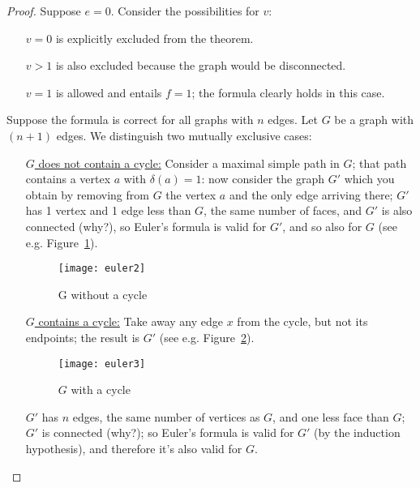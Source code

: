 \begin{proof}

{
Suppose
$e=0$. Consider the possibilities for $v$: 
\begin{itemize}
\item[$v = 0$] is explicitly excluded from the theorem.
\item[$v > 1$] is also excluded because the graph would be disconnected. 
\item[$v=1$] is allowed and entails $f = 1$; the formula clearly holds in this case.
\end{itemize}
}
{
Suppose the formula is
correct for all graphs with $n$ edges. Let $G$ be a graph with $(n+1)$
edges. We distinguish two mutually exclusive cases:
\begin{itemize}
	\item[\underline{$G$ does not contain a c}y\underline{cle:}]
	Consider a maximal
	simple path in $G$; that path contains a vertex $a$ with $\delta(a) =
	1$: now consider the graph $G'$ which you obtain by removing from $G$
	the vertex $a$ and the only edge arriving there; $G'$ has 1 vertex
	and 1 edge less than $G$, the same number of faces, and $G'$ is also
	connected (why?), so Euler's formula is valid for $G'$, and
	so also for $G$ (see e.g. Figure~\ref{euler2}).\\
	\begin{figure}[ht]
		\centering
		\texttt{[image: euler2]}
		\caption{G without a cycle \label{euler2}}
	\end{figure}
	
	\item[\underline{$G$ contains a c}y\underline{cle:}]
	Take away any edge $x$ from
	the cycle, but not its endpoints; the result is $G'$ (see
	e.g. Figure~\ref{euler3}).
	\begin{figure}[ht]
		\centering
		\texttt{[image: euler3]}
		\caption{$G$ with a cycle \label{euler3}}
	\end{figure}
	$G'$ has $n$ edges, the same number of vertices as $G$, and one less
	face than $G$; $G'$ is connected (why?); so Euler's formula is valid
	for $G'$ (by the induction hypothesis), and therefore it's also valid for $G$.
\end{itemize}
}
\end{proof}

